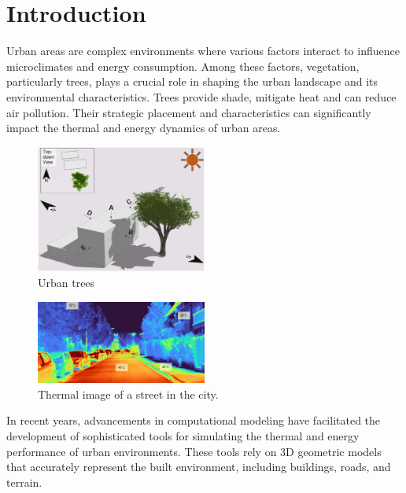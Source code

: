 \documentclass[12pt]{article}
\begin{document}
\newpage

\section{Introduction}
Urban areas are complex environments where various factors interact to influence 
microclimates and energy consumption. Among these factors, 
vegetation, particularly trees, plays a crucial role in shaping the urban landscape 
and its environmental characteristics. Trees provide shade, mitigate heat and can
reduce air pollution. Their strategic placement and characteristics can
significantly impact the thermal and energy dynamics of urban areas.

\begin{figure}[H]
    \centering
    \includegraphics[width=0.5\textwidth]{images/TreeShade.png}
    \caption{Urban trees \cite{img:TreeShade}}
\end{figure}

\begin{figure}[H]
    \centering
    \includegraphics[width=0.5\textwidth]{images/heat_street.png}
    \caption{Thermal image of a street in the city. \cite{img:street_thermography}}
\end{figure}

In recent years, advancements in computational modeling have facilitated the 
development of sophisticated tools for simulating the thermal and energy performance 
of urban environments. These tools rely on 3D geometric models that accurately 
represent the built environment, including buildings, roads, and terrain.
\end{document}
